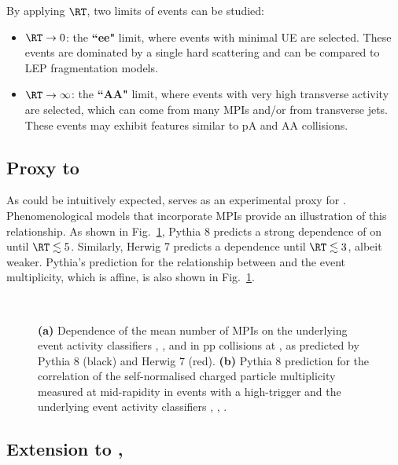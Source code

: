 By applying $\RT$, two limits of events can be studied:
\begin{itemize}
\item $\RT \rightarrow 0$: the \textbf{``ee"} limit, where events with minimal UE are selected. These events are dominated by a single hard scattering and can be compared to LEP fragmentation models.
\item $\RT \rightarrow \infty$: the \textbf{``AA"} limit, where events with very high transverse activity are selected, which can come from many MPIs and/or from transverse jets. These events may exhibit features similar to pA and AA collisions.
\end{itemize}

\subsection{Proxy to \nmpi}

As could be intuitively expected, \RT serves as an experimental proxy for \meannmpi. Phenomenological models that incorporate MPIs provide an illustration of this relationship. As shown in Fig.~\ref{fig:rt:nmpi}, Pythia 8 predicts a strong dependence of \meannmpi on \RT until $\RT \lesssim 5$. Similarly, Herwig 7 predicts a dependence until $\RT \lesssim 3$, albeit weaker. Pythia's prediction for the relationship between \RT and the event multiplicity, which is affine, is also shown in Fig.~\ref{fig:rt:nmpi}.

\begin{figure}%
\\
\caption{\textbf{(a)} Dependence of the mean number of MPIs on the underlying event activity classifiers \RT, \RTmin, and \RTmax in pp collisions at , as predicted by Pythia 8 (black) and Herwig 7 (red). \cite{bencediDisentanglingHardGluon2021} \textbf{(b)} Pythia 8 prediction for the correlation of the self-normalised charged particle multiplicity measured at mid-rapidity in events with a high-\pt trigger and the underlying event activity classifiers \RT, \RTmin, \RTmax. \cite{bencediDisentanglingHardGluon2021}}
\label{fig:rt:nmpi}
\end{figure}


\subsection{Extension to \RTmin, \RTmax}

